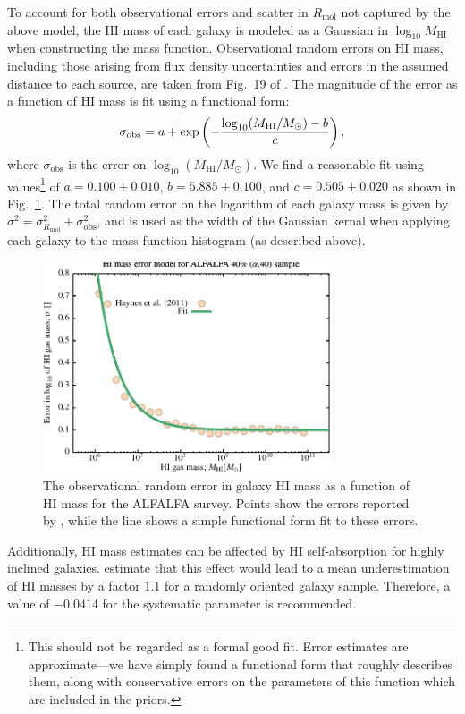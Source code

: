 To account for both observational errors and scatter in $R_\mathrm{mol}$ not captured by the above model, the HI mass of each galaxy is modeled as a Gaussian in $\log_{10}M_\mathrm{HI}$ when constructing the mass function. Observational random errors on HI mass, including those arising from flux density uncertainties and errors in the assumed distance to each source, are taken from Fig.~19 of \cite{haynes_arecibo_2011}. The magnitude of the error as a function of HI mass is fit using a functional form:
\begin{equation}
 \sigma_\mathrm{obs} = a + \exp\left(-{\log_{10}(M_\mathrm{HI}/M_\odot)-b\over c}\right),
\end{equation}
where $\sigma_\mathrm{obs}$ is the error on $\log_{10}(M_\mathrm{HI}/M_\odot)$. We find a reasonable fit using values\footnote{This should not be regarded as a formal good fit. Error estimates are approximate---we have simply found a functional form that roughly describes them, along with conservative errors on the parameters of this function which are included in the priors.} of $a=0.100 \pm 0.010$, $b=5.885 \pm 0.100$, and $c=0.505 \pm 0.020$ as shown in Fig.~\ref{fig:ALFALFAErrorModel}. The total random error on the logarithm of each galaxy mass is given by $\sigma^2 = \sigma_{R_\mathrm{mol}}^2+\sigma_\mathrm{obs}^2$, and is used as the width of the Gaussian kernal when applying each galaxy to the mass function histogram (as described above).

\begin{figure}
 \begin{center}
 \includegraphics[width=85mm,trim=0mm 0mm 0mm 4mm,clip]{Plots/DataAnalysis/alfalfaHIMassErrorModel.pdf}
 \caption{The observational random error in galaxy HI mass as a function of HI mass for the ALFALFA survey. Points show the errors reported by \protect\cite{haynes_arecibo_2011}, while the line shows a simple functional form fit to these errors.}
 \end{center}
 \label{fig:ALFALFAErrorModel}
\end{figure}

Additionally, HI mass estimates can be affected by HI self-absorption for highly inclined galaxies. \cite[][see also \protect\citealt{zwaan_hipass_2005}]{zwaan_h_1997} estimate that this effect would lead to a mean underestimation of HI masses by a factor $1.1$ for a randomly oriented galaxy sample. Therefore, a value of $-0.0414$ for the systematic parameter {\normalfont {}} is recommended.
